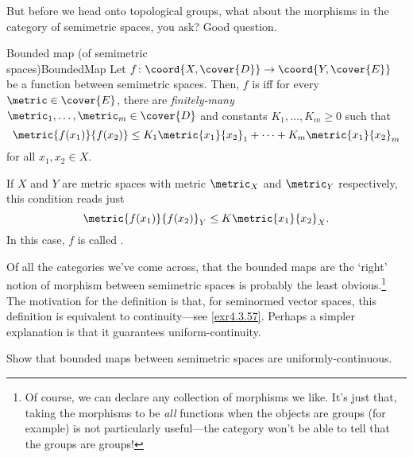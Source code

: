But before we head onto topological groups, what about the morphisms in the category of semimetric spaces, you ask?  Good question.
\begin{dfn}{Bounded map (of semimetric \\ spaces)}{BoundedMap}
Let $f\colon \coord{X,\cover{D}}\rightarrow \coord{Y,\cover{E}}$ be a function between semimetric spaces.  Then, $f$ is  iff for every $\metric \in \cover{E}$, there are \emph{finitely-many} $\metric _1,\ldots ,\metric _m\in \cover{D}$ and constants $K_1,\ldots ,K_m\geq 0$ such that
\begin{equation}
\metric{f(x_1)}{f(x_2)}\leq K_1\metric{x_1}{x_2}_1+\cdots +K_m\metric{x_1}{x_2}_m
\end{equation}
for all $x_1,x_2\in X$.
\begin{rmk}
If $X$ and $Y$ are metric spaces with metric $\metric _X$ and $\metric _Y$ respectively, this condition reads just
\begin{equation}
\metric{f(x_1)}{f(x_2)}_Y\leq K\metric{x_1}{x_2}_X.
\end{equation}
In this case, $f$ is called .
\end{rmk}
\begin{rmk}
Of all the categories we've come across, that the bounded maps are the `right' notion of morphism between semimetric spaces is probably the least obvious.\footnote{Of course, we can declare any collection of morphisms we like.  It's just that, taking the morphisms to be \emph{all} functions when the objects are groups (for example) is not particularly useful---the category won't be able to tell that the groups are groups!}  The motivation for the definition is that, for seminormed vector spaces, this definition is equivalent to continuity---see \cref{exr4.3.57}.  Perhaps a simpler explanation is that it guarantees uniform-continuity.
\end{rmk}
\end{dfn}
\begin{exr}{}{}
Show that bounded maps between semimetric spaces are uniformly-continuous.
\end{exr}
